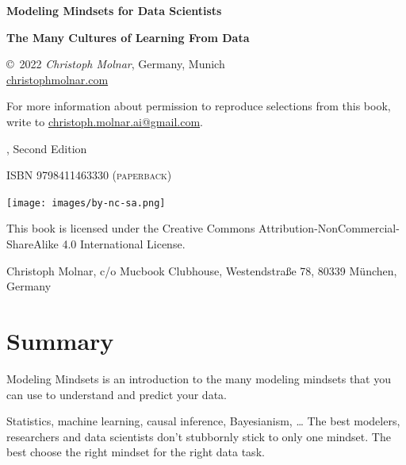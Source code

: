 \documentclass[
  10pt,
]{scrbook}
\begin{document}
\thispagestyle{empty}
\begin{center}
  {
  \bfseries \sffamily \LARGE Modeling Mindsets for Data Scientists \par
  \bfseries \small The Many Cultures of Learning From Data  \par
}

\copyright~2022 \textit{Christoph Molnar}, Germany, Munich\\
\url{christophmolnar.com}

For more information about permission to reproduce selections from this book, write to \url{christoph.molnar.ai@gmail.com}.

	\the\year, Second Edition

\ifxetex
	\textsc{ISBN 9798411463330 (paperback)} 
\fi

\texttt{[image: images/by-nc-sa.png]}

This book is licensed under the Creative Commons Attribution-NonCommercial-ShareAlike 4.0 International License.
  
  Christoph Molnar,
  c/o Mucbook Clubhouse,
  Westendstraße 78,
  80339 München, Germany

\end{center}

\newpage
\thispagestyle{empty}
\mbox{}
\newpage








{
\hypersetup{linkcolor=}
\setcounter{tocdepth}{1}
\tableofcontents
}
\hypertarget{summary}{%
\chapter*{Summary}\label{summary}}


Modeling Mindsets is an introduction to the many modeling mindsets that you can use to understand and predict your data.

Statistics, machine learning, causal inference, Bayesianism, \ldots{}
The best modelers, researchers and data scientists don't stubbornly stick to only one mindset.
The best choose the right mindset for the right data task.
\end{document}
